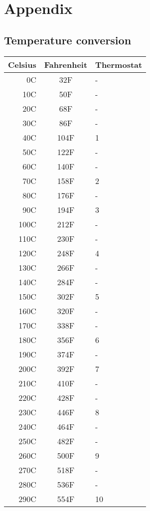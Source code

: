 \documentclass[10pt]{book}
\begin{document}


\newpage
\chapter*{Appendix}

\newpage
\section*{Temperature conversion}

\begin{center}
\begin{tabular}{r c l}
Celsius & Fahrenheit & Thermostat \\
\hline
0C & 32F & - \\
10C & 50F & - \\
20C & 68F & - \\
30C & 86F & - \\
40C & 104F & 1 \\
50C & 122F & - \\
60C & 140F & - \\
70C & 158F & 2 \\
80C & 176F & - \\
90C & 194F & 3 \\
\hline
100C & 212F & - \\
110C & 230F & - \\
120C & 248F & 4 \\
130C & 266F & - \\
140C & 284F & - \\
150C & 302F & 5 \\
160C & 320F & - \\
170C & 338F & - \\
180C & 356F & 6 \\
190C & 374F & - \\
\hline
200C & 392F & 7 \\
210C & 410F & - \\
220C & 428F & - \\
230C & 446F & 8 \\
240C & 464F & - \\
250C & 482F & - \\
260C & 500F & 9 \\
270C & 518F & - \\
280C & 536F & - \\
290C & 554F & 10 \\
\end{tabular}
\end{center}
\end{document}
